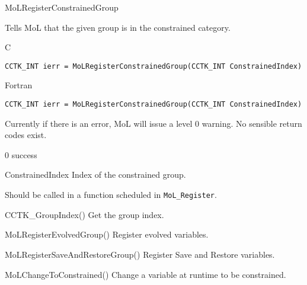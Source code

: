 \begin{FunctionDescription}{MoLRegisterConstrainedGroup}
  \label{CactusBase_MoL_MoLRegisterConstrainedGroup}
  
  Tells MoL that the given group is in the constrained category.

  \begin{SynopsisSection}
    \begin{Synopsis}{C}
\begin{verbatim}
CCTK_INT ierr = MoLRegisterConstrainedGroup(CCTK_INT ConstrainedIndex)
\end{verbatim}
    \end{Synopsis}
    \begin{Synopsis}{Fortran}
\begin{verbatim}
CCTK_INT ierr = MoLRegisterConstrainedGroup(CCTK_INT ConstrainedIndex)
\end{verbatim}
    \end{Synopsis}
  \end{SynopsisSection}

  \begin{ResultSection}
    \begin{ResultNote}
      Currently if there is an error, MoL will issue a level 0
      warning. No sensible return codes exist.
    \end{ResultNote}
    \begin{Result}{\rm 0}
      success
    \end{Result}
  \end{ResultSection}

  \begin{ParameterSection}
    \begin{Parameter}{ConstrainedIndex}
      Index of the constrained group.
    \end{Parameter}
  \end{ParameterSection}

  \begin{Discussion}
    Should be called in a function scheduled in {\tt MoL\_Register}.
  \end{Discussion}

  \begin{SeeAlsoSection}
    \begin{SeeAlso}{CCTK\_GroupIndex()}
      Get the group index.
    \end{SeeAlso}
    \begin{SeeAlso}{MoLRegisterEvolvedGroup()}
      Register evolved variables.
    \end{SeeAlso}
    \begin{SeeAlso}{MoLRegisterSaveAndRestoreGroup()}
      Register Save and Restore variables.
    \end{SeeAlso}
    \begin{SeeAlso}{MoLChangeToConstrained()}
      Change a variable at runtime to be constrained.
    \end{SeeAlso}
  \end{SeeAlsoSection}


\end{FunctionDescription}
